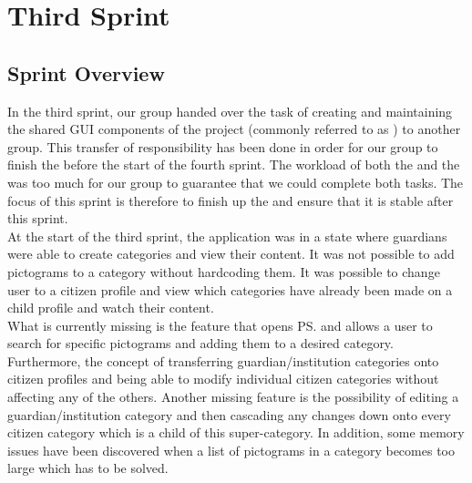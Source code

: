 \part{Third Sprint}
\label{par:third_sprint}

\chapter{Sprint Overview}
In the third sprint, our group handed over the task of creating and maintaining the shared GUI components of the project (commonly referred to as \gc) to another group. This transfer of responsibility has been done in order for our group to finish the \ct before the start of the fourth sprint. The workload of both the \ct and the \gc was too much for our group to guarantee that we could complete both tasks. The focus of this sprint is therefore to finish up the \ct and ensure that it is stable after this sprint.\\

At the start of the third sprint, the application was in a state where guardians were able to create categories and view their content. It was not possible to add pictograms to a category without hardcoding them. It was possible to change user to a citizen profile and view which categories have already been made on a child profile and watch their content. \\

What is currently missing is the feature that opens \ps and allows a user to search for specific pictograms and adding them to a desired category. Furthermore, the concept of transferring guardian/institution categories onto citizen profiles and being able to modify individual citizen categories without affecting any of the others. Another missing feature is the possibility of editing a guardian/institution category and then cascading any changes down onto every citizen category which is a child of this super-category. In addition, some memory issues have been discovered when a list of pictograms in a category becomes too large which has to be solved. 



